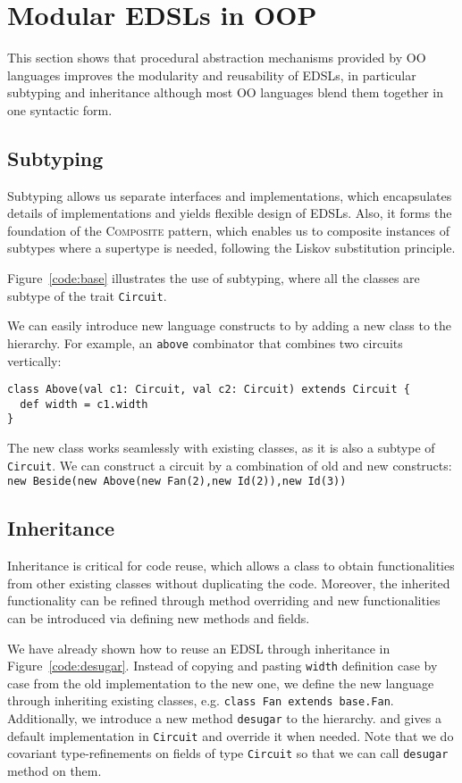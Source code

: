 \section{Modular EDSLs in OOP}
This section shows that procedural abstraction mechanisms provided by OO
languages improves the modularity and reusability of EDSLs, in particular
subtyping and inheritance although most OO languages blend them together in one
syntactic form.

\subsection{Subtyping}
Subtyping allows us separate interfaces and implementations, which
encapsulates details of implementations and yields flexible design of EDSLs.
Also, it forms the foundation of the \textsc{Composite} pattern,
which enables us to composite instances of subtypes where a supertype is needed,
following the Liskov substitution principle.

Figure~\ref{code:base} illustrates the use of subtyping,
where all the classes are subtype of the trait \lstinline{Circuit}.

We can easily introduce new language constructs to \dsl by adding a new class to
the hierarchy.
For example, an \lstinline{above} combinator that combines two circuits vertically:
\begin{lstlisting}
class Above(val c1: Circuit, val c2: Circuit) extends Circuit {
  def width = c1.width
}
\end{lstlisting}
The new class works seamlessly with existing classes, as it is also a subtype of
\lstinline{Circuit}. We can construct a circuit by a combination of old
and new constructs:\\
\lstinline{new Beside(new Above(new Fan(2),new Id(2)),new Id(3))}


\subsection{Inheritance}
Inheritance is critical for code reuse, which allows
a class to obtain functionalities from other existing classes
without duplicating the code.
Moreover, the inherited functionality can be refined through method overriding
and new functionalities can be introduced via defining new methods and
fields.

We have already shown how to reuse an EDSL through inheritance in Figure~\ref{code:desugar}.
Instead of copying and pasting \lstinline{width} definition case by case
from the old implementation to the new one, we define the new language through inheriting existing
classes, e.g. \lstinline{class Fan extends base.Fan}.
Additionally, we introduce a new method \lstinline{desugar} to the hierarchy.
and gives a default implementation in \lstinline{Circuit} and override it when needed.
Note that we do covariant type-refinements on fields of type \lstinline{Circuit} so that
we can call \lstinline{desugar} method on them.

